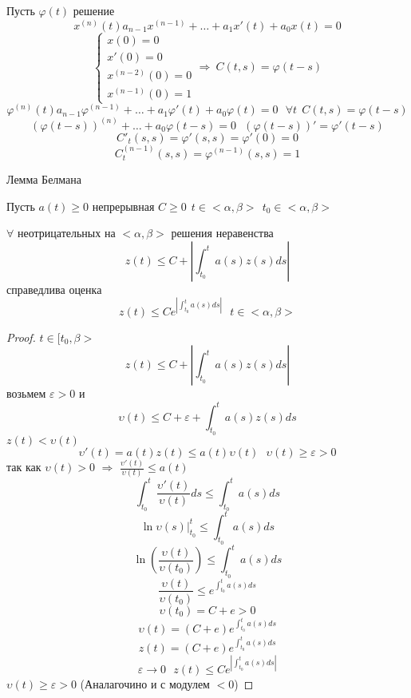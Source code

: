 \begin{block}[Предложение]
  Пусть $\varphi(t)$ решение
  $$
  x^{(n)}(t) a_{n-1}x^{(n-1)} + \ldots + a_1 x'(t) + a_0 x(t) = 0
  $$
  $$
  \left\{
  \begin{array}{l}
    x(0) = 0 \\
    x'(0) = 0 \\
    x^{(n-2)}(0) = 0 \\
    x^{(n-1)}(0) = 1
  \end{array}
  \right.
  \Rightarrow ~ C(t,s) = \varphi(t-s)
  $$
  $$
  \varphi^{(n)}(t) a_{n-1}\varphi^{(n-1)} + \ldots + a_1 \varphi'(t) + a_0
  \varphi(t) = 0 ~~~ \forall t ~~ C(t,s) = \varphi(t-s)
  $$
  $$
  (\varphi(t-s))^{(n)} + \ldots + a_0 \varphi(t-s) = 0
  ~~~
  (\varphi(t-s))' = \varphi'(t-s)
  $$
  $$
  C'_t(s,s) =  \varphi'(s,s) = \varphi'(0) = 0
  $$
  $$
  C^{(n-1)}_t(s,s) = \varphi^{(n-1)}(s,s) = 1
  $$
\end{block}

\begin{title}[\Large]
  Лемма Белмана
\end{title}

\begin{block}
  Пусть $a(t) \ge 0$ непрерывная $C \ge 0 ~~ t \in <\alpha, \beta> ~~
  t_0 \in <\alpha, \beta>$

  $\forall$ неотрицательных на $<\alpha, \beta>$ решения неравенства
  $$
  z(t) \le C + \left| \int_{t_0}^t a(s) z(s) ds \right|
  $$
  справедлива оценка
  $$
  z(t) \le C e^{\left| \int_{t_0}^t a(s) ds \right|}
  ~~~
  t \in <\alpha, \beta>
  $$
\end{block}

\begin{proof}
  $t \in [t_0, \beta>$
  $$
  z(t) \le C + \left| \int_{t_0}^t a(s) z(s) ds \right|
  $$
  возьмем $\varepsilon > 0$ и
  $$
  \upsilon(t) \le C + \varepsilon + \int_{t_0}^t a(s) z(s) ds
  $$
  $z(t) < \upsilon(t)$
  $$
  \upsilon '(t) = a(t)z(t) \le a(t) \upsilon(t)
  ~~~
  \upsilon(t) \ge \varepsilon > 0
  $$
  так как $\upsilon(t) > 0$ $\Rightarrow$
  $\frac{\upsilon'(t)}{\upsilon(t)} \le a(t)$
  $$
  \int_{t_0}^t \frac{\upsilon'(t)}{\upsilon(t)} ds \le \int_{t_0}^t a(s) ds
  $$
  $$
  \ln \upsilon(s)|_{t_0}^t \le \int_{t_0}^t a(s) ds
  $$
  $$
  \ln \left( \frac{\upsilon(t)}{\upsilon(t_0)} \right) \le \int_{t_0}^t a(s) ds
  $$
  $$
  \frac{\upsilon(t)}{\upsilon(t_0)} \le e^{\int_{t_0}^t a(s) ds}
  $$
  $$
  \upsilon(t_0) = C + e > 0
  $$
  $$
  \upsilon(t) = (C + e)e^{\int_{t_0}^t a(s) ds}
  $$
  $$
  z(t) = (C + e)e^{\int_{t_0}^t a(s) ds}
  $$
  $$
  \varepsilon \to 0 ~~~ z(t) \le C e^{\left| \int_{t_0}^t a(s) ds \right|}
  $$
  $\upsilon(t) \ge \varepsilon > 0$ (Аналагочино и с модулем $< 0$)
\end{proof}

